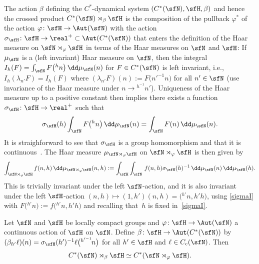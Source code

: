 The action $\beta$
defining the $C^*$-dynamical system $(C^*(\sfN ),\sfH ,\beta)$ and hence the crossed
product $C^*(\sfN )\rtimes_\beta \sfH $ is the composition
of the pullback $\varphi^*$ of the action $\varphi\colon \sfH \to \Aut(\sfN )$ with
the action $\sigma_\sfH\colon \sfH \to \real^+\subset \Aut(C^*(\sfN ))$ that enters the
definition of the Haar measure on $\sfN \rtimes_\varphi \sfH $ in terms of the Haar
measures on $\sfN $ and $\sfH $: If $\mu_\sfN $ is a (left invariant)
Haar measure on $\sfN $, then the integral
$I_h(F)=\int_\sfN F\big({}^hn\big)\, \dd\mu_\sfN (n)$ for $F\in C^*(\sfN )$
is left invariant, i.e.,
$I_h(\lambda_{n'}F)= I_h(F)$ where $(\lambda_{n'}F)(n):=F\big(n'^{-1} n\big)$
for all $n'\in \sfN $
(use invariance of the Haar measure under $n\to {}^{h^{-1\!}}n'$).
Uniqueness of the Haar measure up to a positive constant then
implies there exists a function $\sigma_\sfH\colon \sfH\to\real^+$ such that
\begin{gather}\label{sigmaI}
\sigma_\sfH(h) \int_\sfN F\big({}^hn\big) \, \dd\mu_\sfN (n)=\int_\sfN F(n)
\, \dd\mu_\sfN (n) .
\end{gather}
It is straighforward to see that
$\sigma_\sfH$ is a group homomorphism and that it is
continuous~\cite[Section~2]{Williams2007}. The Haar measure
$\mu_{\sfN\rtimes_\varphi\sfH}$ on
$\sfN \rtimes_\varphi \sfH $ is then given by
\[
\int_{\sfN\rtimes_\varphi\sfH} f(n,h) \,
\dd\mu_{\sfN\rtimes_\varphi\sfH}(n,h) := \int_\sfH \int_\sfN\,
f(n,h) \sigma_\sfH(h)^{-1} \, \dd\mu_\sfN (n) \, \dd\mu_\sfH (h) .
\]
This is trivially invariant under the left $\sfN $-action, and
it is also invariant under the left $\sfH $-action $(n,h)\mapsto
(1,h') (n,h)=\big({}^{h'\!}n, h' h\big)$, using \eqref{sigmaI} with $F\big({}^{h'\!}n\big) :=f\big({}^{h'\!}n, h' h\big)$
and recalling that~$h$ is fixed in~\eqref{sigmaI}.

\begin{Theorem}\label{cpsp2}
Let $\sfN $ and $\sfH $ be locally compact groups
 and $\varphi \colon \sfH \to \Aut(\sfN )$ a continuous action of $\sfH $ on $\sfN $. Define
$\beta\colon \sfH \to \Aut(C^*(\sfN ))$ by $(\beta_{h'}\ell)
(n)=\sigma_\sfH(h')^{-1} \ell\big({}^{h'^{-1\!}}n\big)$ for all $h'\in \sfH $ and
$\ell\in C_{\rm c}(\sfN )$. Then
\[
C^*(\sfN )\rtimes_{\beta}\sfH \simeq C^*(\sfN \rtimes_\varphi
\sfH ) .
\]
\end{Theorem}

